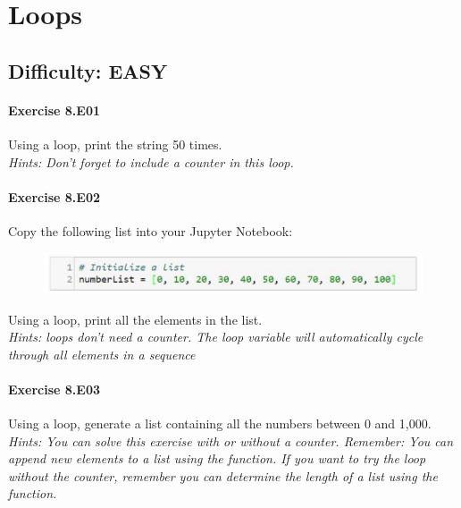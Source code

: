 \chapter{Loops}\label{CHAP_Loops}

\section{Difficulty: EASY}

\subsubsection*{Exercise 8.E01}
Using a {} loop, print the string {} 50 times.\\

\textit{Hints:
Don’t forget to include a counter in this {} loop.}\\[1cm]



\subsubsection*{Exercise 8.E02}
Copy the following list into your Jupyter Notebook:
\begin{figure}[H]
		\centering
		\includegraphics[width=\textwidth]{../IMG/8E02.png} 
\end{figure}
Using a {} loop, print all the elements in the list.\\


\textit{Hints:
{} loops don’t need a counter. The loop variable will automatically cycle through all elements in a sequence}\\[1cm]



\subsubsection*{Exercise 8.E03}
Using a {} loop, generate a list containing all the numbers between 0 and 1,000.\\


\textit{Hints:
You can solve this exercise with or without a counter. Remember: You can append new
elements to a list using the {} function. If you want to try the loop without the counter, remember you can determine the length of a list using the {} function.}\\[1cm]


